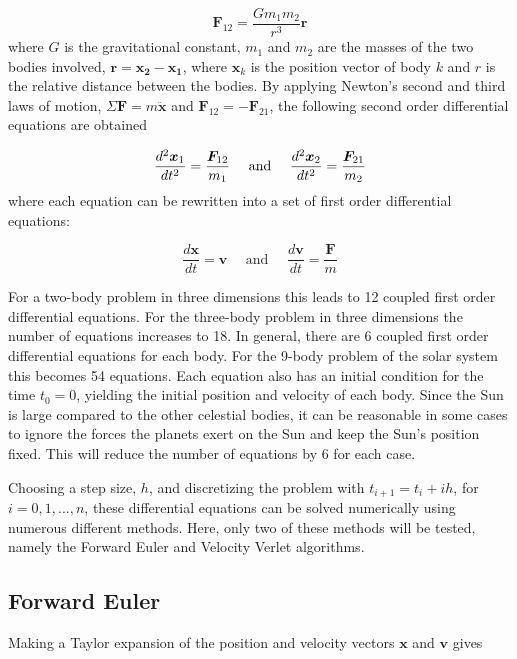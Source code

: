 \documentclass{article}
\begin{document}
\begin{equation}
\bm{F}_{12} = \frac{Gm_1m_2}{r^3}\bm{r}
\end{equation}
where $G$ is the gravitational constant, $m_1$ and $m_2$ are the masses of the two bodies involved, $\bm{r} = \bm{x_2} - \bm{x_1}$, where $\bm{x}_k$ is the position vector of body $k$ and $r$ is the relative distance between the bodies. By applying Newton's second and third laws of motion, $\Sigma\bm{F} = m\bm{\ddot x}$ and $\bm{F}_{12}=-\bm{F}_{21}$, the following second order differential equations are obtained

\begin{equation}
\frac{d^2\bm{x}_1}{dt^2} = \frac{\bm{F_}{12}}{m_1} \quad \text{ and } \quad \frac{d^2\bm{x}_2}{dt^2} = \frac{\bm{F}_{21}}{m_2}
\end{equation}
where each equation can be rewritten into a set of first order differential equations:

\begin{equation}
\frac{d\bm{x}}{dt} = \bm{v} \quad \text{ and } \quad \frac{d\bm{v}}{dt} = \frac{\bm{F}}{m}
\end{equation}

For a two-body problem in three dimensions this leads to 12 coupled first order differential equations. For the three-body problem in three dimensions the number of equations increases to 18. In general, there are 6 coupled first order differential equations for each body. For the 9-body problem of the solar system this becomes 54 equations. Each equation also has an initial condition for the time $t_0=0$, yielding the initial position and velocity of each body. Since the Sun is large compared to the other celestial bodies, it can be reasonable in some cases to ignore the forces the planets exert on the Sun and keep the Sun's position fixed. This will reduce the number of equations by 6 for each case.

Choosing a step size, $h$, and discretizing the problem with $t_{i+1} = t_i + ih$, for $i=0,1,...,n$, these differential equations can be solved numerically using numerous different methods. Here, only two of these methods will be tested, namely the Forward Euler and Velocity Verlet algorithms.

\subsection{Forward Euler}
\label{sec:euler}
Making a Taylor expansion of the position and velocity vectors $\bm{x}$ and $\bm{v}$ gives
\end{document}
